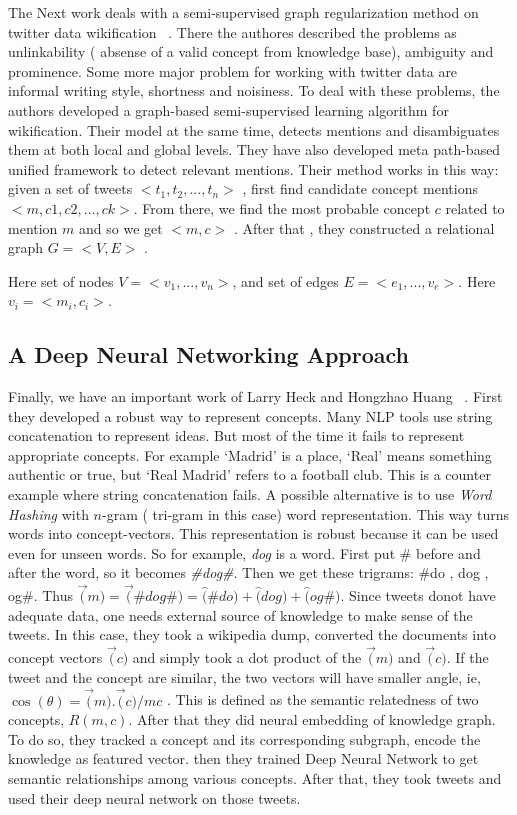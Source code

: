 The Next work deals with a semi-supervised graph regularization method on 
twitter data wikification ~\cite{ref4tw-wiki}. There the authores described the problems as unlinkability 
( absense of a valid concept from knowledge base), ambiguity and prominence. Some more major problem for working
with twitter data are informal writing style, shortness and noisiness. To deal with these problems, the authors 
developed a graph-based semi-supervised learning algorithm for wikification. Their model at the same time, detects 
mentions and disambiguates them at both local and global levels. They have also developed meta path-based unified framework
to detect relevant mentions. Their method works in this way: given a set of tweets $<t_1,t_2,... ,t_n>$ ,
first find candidate concept mentions $<m,c1,c2,...,ck>$. From there, we find the most probable concept $c$
related to  mention $m$ and so we get $<m,c>$ . After that , they constructed a relational graph $G= <V,E>$ .

Here set of nodes $V = <v_1,...,v_n>$, and set of edges $E = <e_1,...,v_e>$. Here $v_i = <m_i, c_i>$. 
\subsection{A Deep Neural Networking Approach}
Finally, we have an important work of Larry Heck and Hongzhao Huang ~\cite{ref1DeepLearning}. 
First they developed a robust way to represent concepts.
 Many NLP tools use string concatenation to represent ideas.
But most of the time it fails to represent appropriate concepts. For example `Madrid' is a place, `Real'
 means 
something authentic or true, but `Real Madrid' refers to a football club. 
This is a counter example where string concatenation fails.
A possible alternative is to use \textit{Word Hashing} with $n$-gram ( tri-gram in this case) 
word representation. This way turns words into concept-vectors. This representation is 
robust because it can be used even for unseen words.
So for example, \textit{dog} is a word. First put \# before and after the word, so it becomes \textit{\#dog\#}.
Then we get these trigrams: \#do , dog , og\#.
  Thus $ \vec(m) = \vec(\#dog\#) = \widehat(\#do) + \widehat(dog) + \widehat(og\#)$.
  Since tweets donot have adequate data, one needs external source of knowledge to  make sense of 
  the tweets. In this case, they took a wikipedia dump, converted the documents into concept vectors
   $\vec(c)$ and simply took a dot product of the $ \vec(m) $ and $ \vec(c) $. If the tweet and the concept 
   are similar, the two vectors will have smaller angle, ie, $ \cos(\theta) = \vec(m).\vec(c)/mc $ . 
This is defined as the semantic relatedness of two concepts, $R(m,c) $.
 After that they did neural embedding of knowledge
 graph. 
 To do so, they tracked a concept and its corresponding subgraph, encode the knowledge as featured 
 vector.
 then they trained Deep Neural Network to get semantic relationships among various concepts.
After that, they took tweets and used their deep neural network on those tweets.
\endinput
